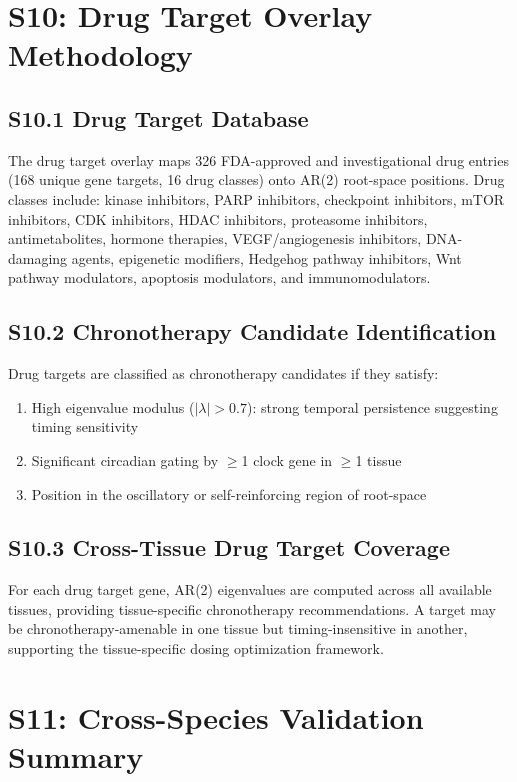 \documentclass[11pt,a4paper]{article}
\begin{document}
\section{S10: Drug Target Overlay Methodology}

\subsection{S10.1 Drug Target Database}

The drug target overlay maps 326 FDA-approved and investigational drug entries (168 unique gene targets, 16 drug classes) onto AR(2) root-space positions. Drug classes include: kinase inhibitors, PARP inhibitors, checkpoint inhibitors, mTOR inhibitors, CDK inhibitors, HDAC inhibitors, proteasome inhibitors, antimetabolites, hormone therapies, VEGF/angiogenesis inhibitors, DNA-damaging agents, epigenetic modifiers, Hedgehog pathway inhibitors, Wnt pathway modulators, apoptosis modulators, and immunomodulators.

\subsection{S10.2 Chronotherapy Candidate Identification}

Drug targets are classified as chronotherapy candidates if they satisfy:
\begin{enumerate}
    \item High eigenvalue modulus ($|\lambda| > 0.7$): strong temporal persistence suggesting timing sensitivity
    \item Significant circadian gating by $\geq$1 clock gene in $\geq$1 tissue
    \item Position in the oscillatory or self-reinforcing region of root-space
\end{enumerate}

\subsection{S10.3 Cross-Tissue Drug Target Coverage}

For each drug target gene, AR(2) eigenvalues are computed across all available tissues, providing tissue-specific chronotherapy recommendations. A target may be chronotherapy-amenable in one tissue but timing-insensitive in another, supporting the tissue-specific dosing optimization framework.

\section{S11: Cross-Species Validation Summary}
\end{document}
